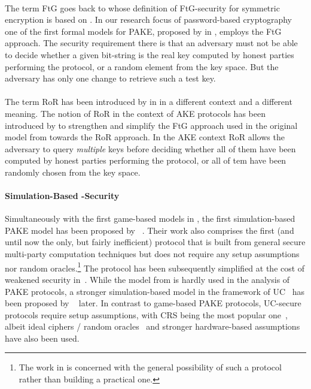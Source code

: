 \paragraph{}
The term \acl{FtG} goes back to \citeauthor{Bellare97} \cite{Bellare97} whose definition of \ac{FtG}-security for symmetric encryption is based on \cite{Goldwasser84} \cite{Micali86}.
In our research focus of password-based cryptography one of the first formal models for \ac{PAKE}, proposed by \citeauthor{Bellare2000} in \cite{Bellare2000}, employs the \ac{FtG} approach.
The security requirement there is that an adversary must not be able to decide whether a given bit-string is the real key computed by honest parties performing the protocol, or a random element from the key space.
But the adversary has only one change to retrieve such a test key.

\paragraph{}
The term \acl{RoR} has been introduced by \citeauthor{Bellare97} in \cite{Bellare97} in a different context and a different meaning.
The notion of \ac{RoR} in the context of \acl{AKE} protocols has been introduced by \citeauthor{Abdalla2005} to strengthen and simplify the \ac{FtG} approach used in the original model from \cite{Bellare2000} towards the \ac{RoR} approach.
In the \ac{AKE} context \ac{RoR} allows the adversary to query \emph{multiple} keys before deciding whether all of them have been computed by honest parties performing the protocol, or all of tem  have been randomly chosen from the key space.


\paragraph{Simulation-Based -Security}
Simultaneously with the first game-based models in \cite{Bellare2000,Boyko2000}, the first simulation-based \ac{PAKE} model has been proposed by \citeauthor{Goldreich01}~\cite{Goldreich01}.
Their work also comprises the first (and until now the only, but fairly inefficient) protocol that is built from general secure multi-party computation techniques but does not require any setup assumptions nor random oracles.\footnote{The work in \cite{Goldreich01} is concerned with the general possibility of such a protocol rather than building a practical one.}
The protocol has been subsequently simplified at the cost of weakened security in~\cite{NguyenV04}.
While the model from \cite{Goldreich01} is hardly used in the analysis of \ac{PAKE} protocols, a stronger simulation-based model in the framework of \acl{UC}~\cite{Canetti2001a} has been proposed by \citeauthor{Canetti2005}~\cite{Canetti2005} later.
In contrast to game-based \ac{PAKE} protocols, \ac{UC}-secure protocols require setup assumptions, with CRS being the most popular one~\cite{Katz2011}, albeit ideal ciphers / random oracles~\cite{Abdalla2008} and stronger hardware-based assumptions~\cite{cryptoeprint:2012:537} have also been used.

